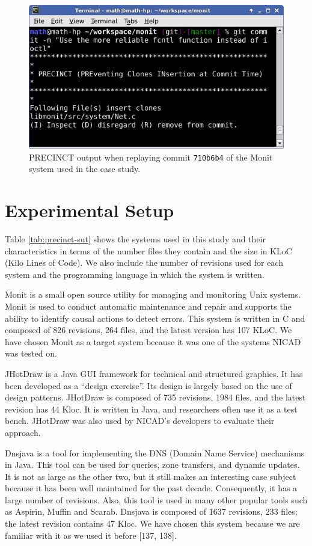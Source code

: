 \documentclass[12pt]{report}
\begin{document}
\begin{figure}
  \centering
  \includegraphics[width=\linewidth]{media/chap5/commit.png}
  \caption{PRECINCT output when replaying commit \texttt{710b6b4} of the Monit system used in the case study.\label{fig:precinct-hook}}
\end{figure}

\section{Experimental Setup}\label{experimental-setup-1}

Table \ref{tab:precinct-sut} shows the systems used in this study and
their characteristics in terms of the number files they contain and the
size in KLoC (Kilo Lines of Code). We also include the number of
revisions used for each system and the programming language in which the
system is written.

Monit is a small open source utility for managing and monitoring Unix
systems. Monit is used to conduct automatic maintenance and repair and
supports the ability to identify causal actions to detect errors. This
system is written in C and composed of 826 revisions, 264 files, and the
latest version has 107 KLoC. We have chosen Monit as a target system
because it was one of the systems NICAD was tested on.

JHotDraw is a Java GUI framework for technical and structured graphics.
It has been developed as a ``design exercise''. Its design is largely
based on the use of design patterns. JHotDraw is composed of 735
revisions, 1984 files, and the latest revision has 44 Kloc. It is
written in Java, and researchers often use it as a test bench. JHotDraw
was also used by NICAD's developers to evaluate their approach.

Dnsjava is a tool for implementing the DNS (Domain Name Service)
mechanisms in Java. This tool can be used for queries, zone transfers,
and dynamic updates. It is not as large as the other two, but it still
makes an interesting case subject because it has been well maintained
for the past decade. Consequently, it has a large number of revisions.
Also, this tool is used in many other popular tools such as Aspirin,
Muffin and Scarab. Dnsjava is composed of 1637 revisions, 233 files; the
latest revision contains 47 Kloc. We have chosen this system because we
are familiar with it as we used it before {[}137, 138{]}.
\end{document}
